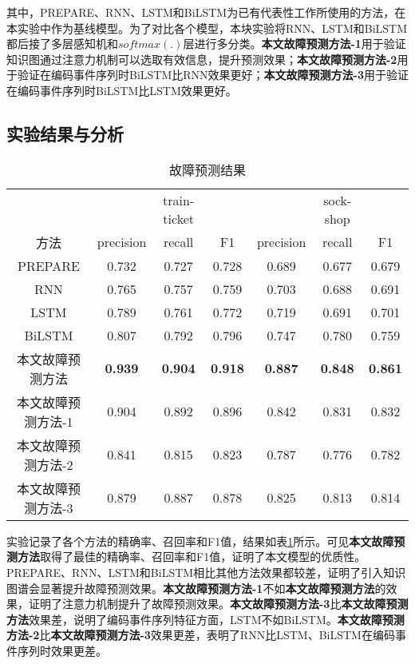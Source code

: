 其中，PREPARE、RNN、LSTM和BiLSTM为已有代表性工作所使用的方法，在本实验中作为基线模型。为了对比各个模型，本块实验将RNN、LSTM和BiLSTM都后接了多层感知机和$softmax(.)$层进行多分类。\textbf{本文故障预测方法-1}用于验证知识图通过注意力机制可以选取有效信息，提升预测效果；\textbf{本文故障预测方法-2}用于验证在编码事件序列时BiLSTM比RNN效果更好；\textbf{本文故障预测方法-3}用于验证在编码事件序列时BiLSTM比LSTM效果更好。

\subsection{实验结果与分析}
\begin{table}[htbp]
    \caption{故障预测结果}
    \centering
    \label{anom-predict}
    \begin{tabular}{ccccccc}
    \hline
               &                & train-ticket   &                &                & sock-shop      &                \\
    方法         & precision      & recall         & F1             & precision      & recall         & F1             \\ \hline
    PREPARE    & 0.732          & 0.727          & 0.728          & 0.689          & 0.677          & 0.679          \\
    RNN        & 0.765          & 0.757          & 0.759          & 0.703          & 0.688          & 0.691          \\
    LSTM       & 0.789          & 0.761          & 0.772          & 0.719          & 0.691          & 0.701          \\
    BiLSTM     & 0.807          & 0.792          & 0.796          & 0.747          & 0.780          & 0.759          \\
    本文故障预测方法       & \textbf{0.939} & \textbf{0.904} & \textbf{0.918} & \textbf{0.887} & \textbf{0.848} & \textbf{0.861} \\
    本文故障预测方法-1 & 0.904          & 0.892          & 0.896          & 0.842          & 0.831          & 0.832          \\
    本文故障预测方法-2 & 0.841          & 0.815          & 0.823          & 0.787          & 0.776          & 0.782          \\
    本文故障预测方法-3 & 0.879          & 0.887          & 0.878          & 0.825          & 0.813          & 0.814          \\ \hline
    \end{tabular}
    \end{table}
实验记录了各个方法的精确率、召回率和F1值，结果如表\ref{anom-predict}所示。可见\textbf{本文故障预测方法}取得了最佳的精确率、召回率和F1值，证明了本文模型的优质性。PREPARE、RNN、LSTM和BiLSTM相比其他方法效果都较差，证明了引入知识图谱会显著提升故障预测效果。\textbf{本文故障预测方法-1}不如\textbf{本文故障预测方法}的效果，证明了注意力机制提升了故障预测效果。\textbf{本文故障预测方法-3}比\textbf{本文故障预测方法}效果差，说明了编码事件序列特征方面，LSTM不如BiLSTM。\textbf{本文故障预测方法-2}比\textbf{本文故障预测方法-3}效果更差，表明了RNN比LSTM、BiLSTM在编码事件序列时效果更差。

